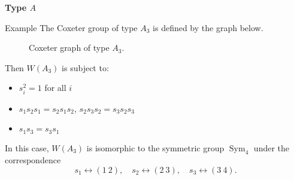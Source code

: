 \documentclass[9pt,handout]{beamer}
\newcommand{\<}{\langle}
\renewcommand{\>}{\rangle}
\DeclareMathOperator{\Sym}{Sym}
\begin{document}
\begin{frame}{\textbf{Type $A$}}

\begin{block}{Example}
The Coxeter group of type $A_3$ is defined by the graph below.
\begin{figure}
\caption{Coxeter graph of type $A_3$.}
\end{figure}
\vspace{-1em}
\pause Then $W(A_{3})$ is subject to:
\begin{itemize}
\item $s_{i}^{2}=1$ for all $i$
\item $s_{1}s_{2}s_{1}=s_{2}s_{1}s_{2}$, \quad $s_{2}s_{3}s_{2}=s_{3}s_{2}s_{3}$ 
\item $s_{1}s_{3}=s_{3}s_{1}$
\end{itemize}

\pause
\medskip

In this case, $W(A_3)$ is isomorphic to the symmetric group $\Sym_4$ under the correspondence
	\[
	s_1 \leftrightarrow (1\ 2), \quad s_2 \leftrightarrow (2\ 3), \quad s_3 \leftrightarrow (3\ 4).
	\]
\end{block}

\end{frame}



\end{document}
